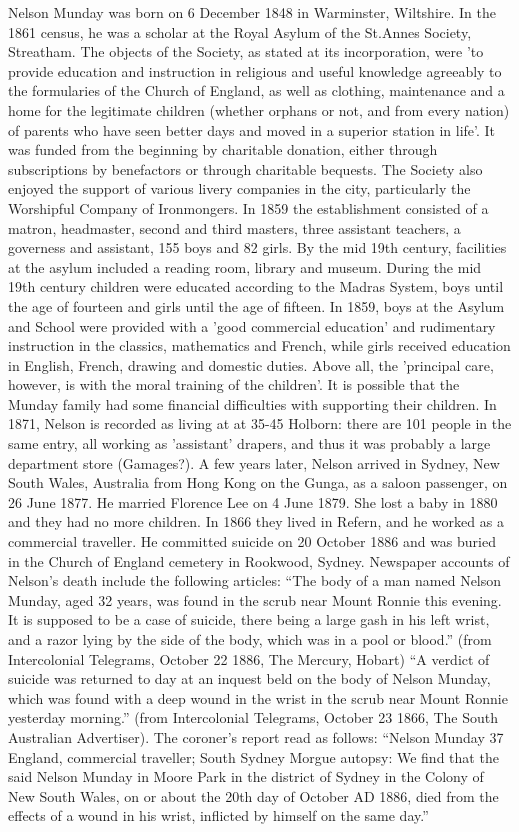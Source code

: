 Nelson Munday was born on 6 December 1848 in	Warminster, Wiltshire. In the 1861 census, he was a scholar at the Royal Asylum of the St.Annes Society, Streatham. The objects of the Society, as stated at its incorporation, were 'to provide education and instruction in religious and useful knowledge agreeably to the formularies of the Church of England, as well as clothing, maintenance and a home for the legitimate children (whether orphans or not, and from every nation) of parents who have seen better days and moved in a superior station in life'. It was funded from the beginning by charitable donation, either through subscriptions by benefactors or through charitable bequests. The Society also enjoyed the support of various livery companies in the city, particularly the Worshipful Company of Ironmongers. In 1859 the establishment consisted of a matron, headmaster, second and third masters, three assistant teachers, a governess and assistant, 155 boys and 82 girls. By the mid 19th century, facilities at the asylum included a reading room, library and museum. During the mid 19th century children were educated according to the Madras System, boys until the age of fourteen and girls until the age of fifteen. In 1859, boys at the Asylum and School were provided with a 'good commercial education' and rudimentary instruction in the classics, mathematics and French, while girls received education in English, French, drawing and domestic duties. Above all, the 'principal care, however, is with the moral training of the children'. It is possible that the Munday family had some financial difficulties with supporting their children.
In 1871, Nelson is recorded as living at at 35-45 Holborn: there are 101 people in the same entry, all working as 'assistant' drapers, and thus it was probably a large department store (Gamages?). A few years later, Nelson arrived in Sydney, New South Wales, Australia from Hong Kong on the Gunga, as a saloon passenger, on 26 June 1877. He married Florence Lee on 4 June 1879. She lost a baby in 1880 and they had no more children. In 1866 they lived in Refern, and he worked as a commercial traveller.  He committed suicide on 20 October 1886 and was buried in the Church of England cemetery in Rookwood, Sydney.
Newspaper accounts of Nelson's death include the following articles: 
  ``The body of a man named Nelson Munday, aged 32 years, was found in the scrub near Mount Ronnie this evening. It is supposed to be a case of suicide, there being a large gash in his left wrist, and a razor lying by the side of the body, which was in a pool or blood.'' (from Intercolonial Telegrams, October 22 1886, The Mercury, Hobart) 
 ``A verdict of suicide was returned to day at an inquest beld on the body of Nelson Munday, which was found with a deep wound in the wrist in the scrub near Mount Ronnie yesterday morning.'' (from Intercolonial Telegrams, October 23 1866, The South Australian Advertiser). The coroner's report read as follows: 
``Nelson Munday 37 England, commercial traveller; South Sydney Morgue autopsy:
We find that the said Nelson Munday in Moore Park in the district of Sydney in the Colony of New South Wales, on or about the 20th day of October AD 1886, died from the effects of a wound in his wrist, inflicted by himself on the same day.''

